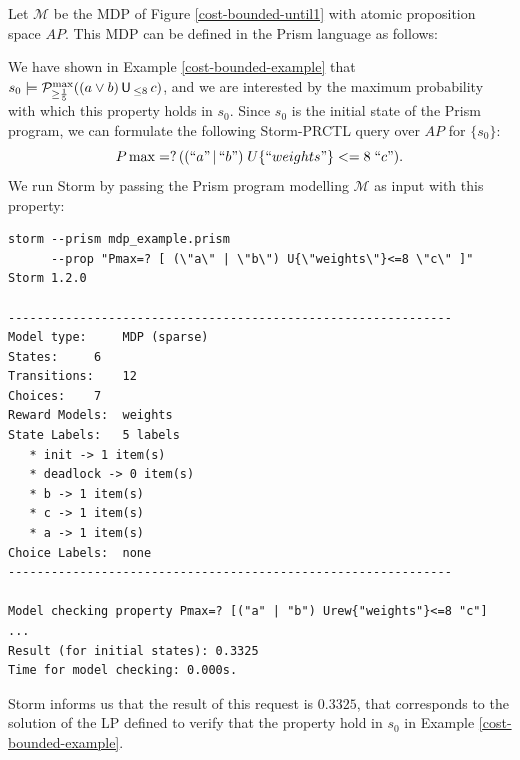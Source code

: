 \begin{example}
  Let $\mathcal{M}$ be the MDP of Figure \ref{cost-bounded-until1} with atomic proposition space $AP$. This MDP can be defined in the Prism language as follows:
  
  We have shown in Example \ref{cost-bounded-example} that $s_0 \models \mathcal{P}^{\max}_{\geq \frac{1}{5}}((a \vee b) \,\text{\sffamily U}\,_{\leq 8} \, c)$, and we are interested by the maximum probability with which this property holds in $s_0$. Since $s_0$ is the initial state of the Prism program, we can formulate the following Storm-PRCTL query over $AP$ for $\{s_0\}$:
  \[
    P\max =? \, ((``a" \, | \, ``b") \; U\{``weights"\}<= 8 \; ``c").
  \]
  We run Storm by passing the Prism program modelling $\mathcal{M}$ as input with this property:

  {\footnotesize
  \begin{verbatim}
storm --prism mdp_example.prism
      --prop "Pmax=? [ (\"a\" | \"b\") U{\"weights\"}<=8 \"c\" ]"
Storm 1.2.0

--------------------------------------------------------------
Model type: 	MDP (sparse)
States: 	6
Transitions: 	12
Choices: 	7
Reward Models:  weights
State Labels: 	5 labels
   * init -> 1 item(s)
   * deadlock -> 0 item(s)
   * b -> 1 item(s)
   * c -> 1 item(s)
   * a -> 1 item(s)
Choice Labels: 	none
--------------------------------------------------------------

Model checking property Pmax=? [("a" | "b") Urew{"weights"}<=8 "c"] ...
Result (for initial states): 0.3325
Time for model checking: 0.000s.
\end{verbatim}
  } \noindent Storm informs us that the result of this request is $0.3325$, that corresponds to the solution of the LP defined to verify that the property hold in $s_0$ in Example \ref{cost-bounded-example}.
\end{example}
